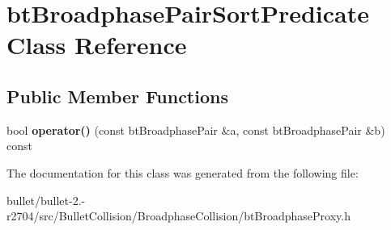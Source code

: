 \hypertarget{classbt_broadphase_pair_sort_predicate}{\section{bt\+Broadphase\+Pair\+Sort\+Predicate Class Reference}
\label{classbt_broadphase_pair_sort_predicate}
}
\subsection*{Public Member Functions}
\begin{DoxyCompactItemize}
\item 
\hypertarget{classbt_broadphase_pair_sort_predicate_a697b7882187e7ef342b8c55006d78d8c}{bool {\bfseries operator()} (const bt\+Broadphase\+Pair \&a, const bt\+Broadphase\+Pair \&b) const }\label{classbt_broadphase_pair_sort_predicate_a697b7882187e7ef342b8c55006d78d8c}

\end{DoxyCompactItemize}


The documentation for this class was generated from the following file\+:\begin{DoxyCompactItemize}
\item 
bullet/bullet-\/2.-\/r2704/src/\+Bullet\+Collision/\+Broadphase\+Collision/bt\+Broadphase\+Proxy.\+h\end{DoxyCompactItemize}
